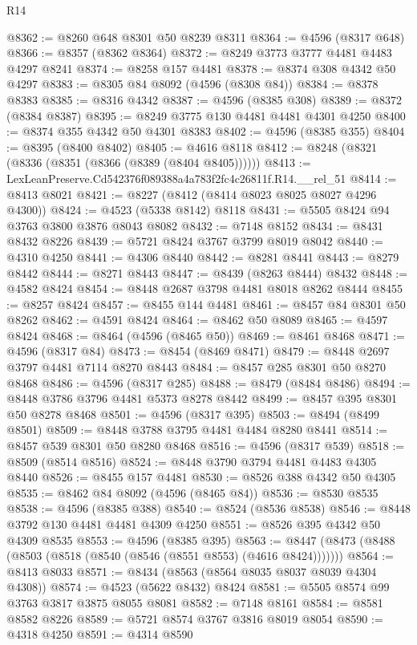 \begin{lexlean}{R14}
\begin{coremodule}
@8362 := @8260 @648 @8301 @50 @8239 @8311
@8364 := @4596 (@8317 @648)
@8366 := @8357 (@8362 @8364)
@8372 := @8249 @3773 @3777 @4481 @4483 @4297 @8241
@8374 := @8258 @157 @4481
@8378 := @8374 @308 @4342 @50 @4297
@8383 := @8305 @84 @8092 (@4596 (@8308 @84))
@8384 := @8378 @8383
@8385 := @8316 @4342
@8387 := @4596 (@8385 @308)
@8389 := @8372 (@8384 @8387)
@8395 := @8249 @3775 @130 @4481 @4481 @4301 @4250
@8400 := @8374 @355 @4342 @50 @4301 @8383
@8402 := @4596 (@8385 @355)
@8404 := @8395 (@8400 @8402)
@8405 := @4616 @8118
@8412 := @8248 (@8321 (@8336 (@8351 (@8366 (@8389 (@8404 @8405))))))
@8413 := LexLeanPreserve.Cd542376f089388a4a783f2fc4c26811f.R14.__rel_51
@8414 := @8413 @8021
@8421 := @8227 (@8412 (@8414 @8023 @8025 @8027 @4296 @4300))
@8424 := @4523 (@5338 @8142) @8118
@8431 := @5505 @8424 @94 @3763 @3800 @3876 @8043 @8082
@8432 := @7148 @8152
@8434 := @8431 @8432 @8226
@8439 := @5721 @8424 @3767 @3799 @8019 @8042
@8440 := @4310 @4250
@8441 := @4306 @8440
@8442 := @8281 @8441
@8443 := @8279 @8442
@8444 := @8271 @8443
@8447 := @8439 (@8263 @8444) @8432
@8448 := @4582 @8424
@8454 := @8448 @2687 @3798 @4481 @8018 @8262 @8444
@8455 := @8257 @8424
@8457 := @8455 @144 @4481
@8461 := @8457 @84 @8301 @50 @8262
@8462 := @4591 @8424
@8464 := @8462 @50 @8089
@8465 := @4597 @8424
@8468 := @8464 (@4596 (@8465 @50))
@8469 := @8461 @8468
@8471 := @4596 (@8317 @84)
@8473 := @8454 (@8469 @8471)
@8479 := @8448 @2697 @3797 @4481 @7114 @8270 @8443
@8484 := @8457 @285 @8301 @50 @8270 @8468
@8486 := @4596 (@8317 @285)
@8488 := @8479 (@8484 @8486)
@8494 := @8448 @3786 @3796 @4481 @5373 @8278 @8442
@8499 := @8457 @395 @8301 @50 @8278 @8468
@8501 := @4596 (@8317 @395)
@8503 := @8494 (@8499 @8501)
@8509 := @8448 @3788 @3795 @4481 @4484 @8280 @8441
@8514 := @8457 @539 @8301 @50 @8280 @8468
@8516 := @4596 (@8317 @539)
@8518 := @8509 (@8514 @8516)
@8524 := @8448 @3790 @3794 @4481 @4483 @4305 @8440
@8526 := @8455 @157 @4481
@8530 := @8526 @388 @4342 @50 @4305
@8535 := @8462 @84 @8092 (@4596 (@8465 @84))
@8536 := @8530 @8535
@8538 := @4596 (@8385 @388)
@8540 := @8524 (@8536 @8538)
@8546 := @8448 @3792 @130 @4481 @4481 @4309 @4250
@8551 := @8526 @395 @4342 @50 @4309 @8535
@8553 := @4596 (@8385 @395)
@8563 := @8447 (@8473 (@8488 (@8503 (@8518 (@8540 (@8546 (@8551 @8553) (@4616 @8424)))))))
@8564 := @8413 @8033
@8571 := @8434 (@8563 (@8564 @8035 @8037 @8039 @4304 @4308))
@8574 := @4523 (@5622 @8432) @8424
@8581 := @5505 @8574 @99 @3763 @3817 @3875 @8055 @8081
@8582 := @7148 @8161
@8584 := @8581 @8582 @8226
@8589 := @5721 @8574 @3767 @3816 @8019 @8054
@8590 := @4318 @4250
@8591 := @4314 @8590

\end{coremodule}
\end{lexlean}
